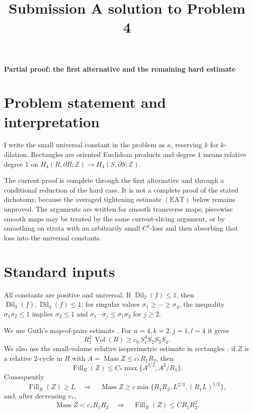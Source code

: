 \documentclass[12pt]{article}
\newcommand{\Dil}{\operatorname{Dil}}
\newcommand{\Vol}{\operatorname{Vol}}
\newcommand{\Mass}{\operatorname{Mass}}
\newcommand{\Fill}{\operatorname{Fill}}
\begin{document}
\title{Submission A solution to Problem 4}
\date{}
\maketitle

\begin{center}
{\bf Partial proof: the first alternative and the remaining hard estimate}
\end{center}

\section*{Problem statement and interpretation}

I write the small universal constant in the problem as \(\kappa\), reserving
\(k\) for \(k\)-dilation.  Rectangles are oriented Euclidean products and
degree \(1\) means relative degree \(1\) on
\(H_4(R,\partial R;\mathbb Z)\to H_4(S,\partial S;\mathbb Z)\).

The current proof is complete through the first alternative and through a
conditional reduction of the hard case.  It is not a complete proof of the
stated dichotomy, because the averaged tightening estimate \((\mathrm{EAT})\)
below remains unproved.  The arguments are written for smooth transverse maps;
piecewise smooth maps may be treated by the same current-slicing argument, or
by smoothing on strata with an arbitrarily small \(C^1\)-loss and then
absorbing that loss into the universal constants.

\section*{Standard inputs}

All constants are positive and universal.  If \(\Dil_2(f)\le1\), then
\(\Dil_3(f),\Dil_4(f)\le1\): for singular values
\(\sigma_1\ge\cdots\ge\sigma_4\), the inequality
\(\sigma_1\sigma_2\le1\) implies \(\sigma_2\le1\) and
\(\sigma_1\cdots\sigma_j\le\sigma_1\sigma_2\) for \(j\ge2\).

We use Guth's map-of-pairs estimate \cite[Estimate 1]{GuthExpanding}.  For
\(n=4,k=2,j=1,l=4\) it gives
\begin{equation}\label{guth14}
        R_1^2\,\Vol(R)\ge c_0\,S_1^3S_2S_3S_4 .
\end{equation}
We also use the small-volume relative isoperimetric estimate in rectangles
\cite[Theorem 3]{GuthExpanding}: if \(Z\) is a relative \(2\)-cycle in \(R\)
with \(A=\Mass Z\le c_*R_1R_2\), then
\[
        \Fill_R(Z)\le C_*\max\{A^{3/2},A^2/R_1\}.
\]
Consequently
\begin{equation}\label{profile-inverse}
\Fill_R(Z)\ge L\quad\Longrightarrow\quad
\Mass Z\ge c\min\{R_1R_2,L^{2/3},(R_1L)^{1/2}\},
\end{equation}
and, after decreasing \(c_*\),
\begin{equation}\label{iso}
        \Mass Z<c_*R_1R_2\quad\Longrightarrow\quad
        \Fill_R(Z)\le C R_1R_2^2 .
\end{equation}
\end{document}
